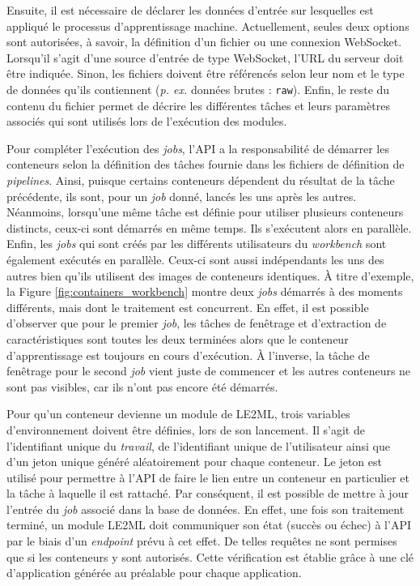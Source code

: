 Ensuite, il est nécessaire de déclarer les données d'entrée sur lesquelles est appliqué le processus d'apprentissage machine. Actuellement, seules deux options sont autorisées, à savoir, la définition d'un fichier ou une connexion WebSocket. Lorsqu'il s'agit d'une source d'entrée de type WebSocket, l'\acs{URL} du serveur doit être indiquée. Sinon, les fichiers doivent être référencés selon leur nom et le type de données qu'ils contiennent (\textit{p. ex.} données brutes : \texttt{raw}). Enfin, le reste du contenu du fichier permet de décrire les différentes tâches et leurs paramètres associés qui sont utilisés lors de l'exécution des modules.

Pour compléter l'exécution des \emph{jobs}, l'\acs{API} a la responsabilité de démarrer les conteneurs selon la définition des tâches fournie dans les fichiers de définition de \textit{pipelines}. Ainsi, puisque certains conteneurs dépendent du résultat de la tâche précédente, ils sont, pour un \emph{job} donné, lancés les uns après les autres. Néanmoins, lorsqu'une même tâche est définie pour utiliser plusieurs conteneurs distincts, ceux-ci sont démarrés en même temps. Ils s'exécutent alors en parallèle. Enfin, les \emph{jobs} qui sont créés par les différents utilisateurs du \textit{workbench} sont également exécutés en parallèle. Ceux-ci sont aussi indépendants les uns des autres bien qu'ils utilisent des images de conteneurs identiques. À titre d'exemple, la Figure \ref{fig:containers_workbench} montre deux \emph{jobs} démarrés à des moments différents, mais dont le traitement est concurrent. En effet, il est possible d'observer que pour le premier \emph{job}, les tâches de fenêtrage et d'extraction de caractéristiques sont toutes les deux terminées alors que le conteneur d'apprentissage est toujours en cours d'exécution. À l'inverse, la tâche de fenêtrage pour le second \emph{job} vient juste de commencer et les autres conteneurs ne sont pas visibles, car ils n'ont pas encore été démarrés.

Pour qu'un conteneur devienne un module de \acs{LE2ML}, trois variables d'environnement doivent être définies, lors de son lancement. Il s'agit de l'identifiant unique du \emph{travail}, de l'identifiant unique de l'utilisateur ainsi que d'un jeton unique généré aléatoirement pour chaque conteneur. Le jeton est utilisé pour permettre à l'\acs{API} de faire le lien entre un conteneur en particulier et la tâche à laquelle il est rattaché. Par conséquent, il est possible de mettre à jour l'entrée du \emph{job} associé dans la base de données. En effet, une fois son traitement terminé, un module LE2ML doit communiquer son état (succès ou échec) à l'\acs{API} par le biais d'un \textit{endpoint} prévu à cet effet. De telles requêtes ne sont permises que si les conteneurs y sont autorisés. Cette vérification est établie grâce à une clé d'application générée au préalable pour chaque application.

